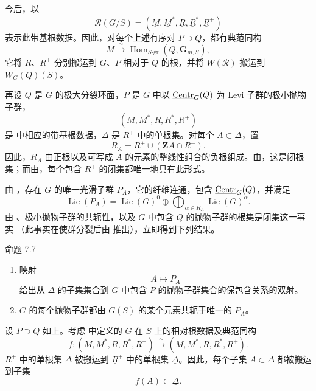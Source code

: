 今后，以
\[
 \mathcal R(G/S)
 =(\underline M,\underline M^*,\underline R,
   \underline R^*,\underline R^+)
\]
表示此带基根数据。因此，对每个上述有序对 \(P\supset Q\)，都有典范同构
\[
 \underline M\xrightarrow{\ \sim\ }
 \operatorname{Hom}_{S\text{-}\mathrm{gr}}(Q,\mathbf G_{m,S}),
\]
它将 \(\underline R\)、\(\underline R^+\) 分别搬运到 \(G\)、\(P\) 相对于 \(Q\) 的根，并将 \(W(\mathcal R)\) 搬运到 \(W_G(Q)(S)\)。


再设 \(Q\) 是 \(G\) 的极大分裂环面，\(P\) 是 \(G\) 中以 \(\underline{\operatorname{Centr}}_G(Q)\) 为 Levi 子群的极小抛物子群，
\[
 (M,M^*,R,R^*,R^+)
\]
是  中相应的带基根数据，\(\Delta\) 是 \(R^+\) 中的单根集。对每个 \(A\subset\Delta\)，置
\[
 R_A=R^+\cup(\mathbf Z A\cap R^-).
\]
因此，\(R_A\) 由正根以及可写成 \(A\) 的元素的整线性组合的负根组成。由，这是闭根集；而由，每个包含 \(R^+\) 的闭集都唯一地具有此形式。

由 ，存在 \(G\) 的唯一光滑子群 \(P_A\)，它的纤维连通，包含 \(\underline{\operatorname{Centr}}_G(Q)\)，并满足
\[
 \operatorname{Lie}(P_A)
 =\operatorname{Lie}(G)^0
  \oplus\bigoplus_{\alpha\in R_A}\operatorname{Lie}(G)^\alpha.
\]
由 、极小抛物子群的共轭性，以及 \(G\) 中包含 \(Q\) 的抛物子群的根集是闭集这一事实 \textup{（此事实在使群分裂后由  推出）}，立即得到下列结果。

\begin{sgastatement}{命题 7.7}
\begin{enumerate}[label=\textup{(\roman*)}]
\item 映射
\[
 A\longmapsto P_A
\]
给出从 \(\Delta\) 的子集集合到 \(G\) 中包含 \(P\) 的抛物子群集合的保包含关系的双射。
\item \(G\) 的每个抛物子群都由 \(G(S)\) 的某个元素共轭于唯一的 \(P_A\)。
\end{enumerate}
\end{sgastatement}


设 \(P\supset Q\) 如上。考虑  中定义的 \(G\) 在 \(S\) 上的相对根数据及典范同构
\[
 f:(M,M^*,R,R^*,R^+)
   \xrightarrow{\ \sim\ }
   (\underline M,\underline M^*,\underline R,
    \underline R^*,\underline R^+).
\]
\(R^+\) 中的单根集 \(\Delta\) 被搬运到 \(\underline R^+\) 中的单根集 \(\underline\Delta\)。因此，每个子集 \(A\subset\Delta\) 都被搬运到子集
\[
 f(A)\subset\underline\Delta.
\]

